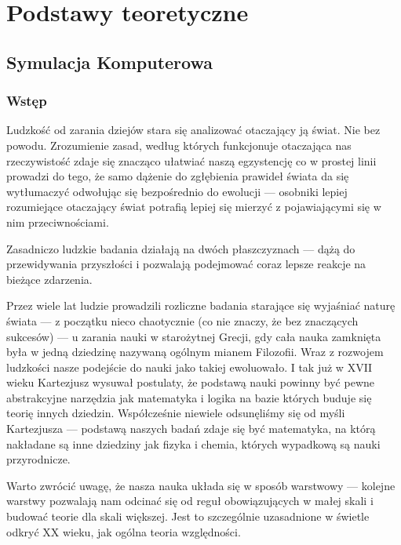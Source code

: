 \chapter{Podstawy teoretyczne}
\section[Symulacja komputerowa][Symulacja komputerowa]{Symulacja Komputerowa}

\subsection{Wstęp}
\par{
Ludzkość od zarania dziejów stara się analizować otaczający ją świat. Nie bez powodu. Zrozumienie zasad, według których funkcjonuje otaczająca nas rzeczywistość zdaje się znacząco ułatwiać naszą egzystencję co w prostej linii prowadzi do tego, że samo dążenie do zgłębienia prawideł świata da się wytłumaczyć odwołując się bezpośrednio do ewolucji --- osobniki lepiej rozumiejące otaczający świat potrafią lepiej się mierzyć z pojawiającymi się w nim przeciwnościami.
}

\par{
Zasadniczo ludzkie badania działają na dwóch płaszczyznach --- dążą do przewidywania przyszłości i pozwalają podejmować coraz lepsze reakcje na bieżące zdarzenia.
}

\par{
Przez wiele lat ludzie prowadzili rozliczne badania starające się wyjaśniać naturę świata --- z początku nieco chaotycznie (co nie znaczy, że bez znaczących sukcesów) --- u zarania nauki w starożytnej Grecji, gdy cała nauka zamknięta była w jedną dziedzinę nazywaną ogólnym mianem Filozofii.
Wraz z rozwojem ludzkości nasze podejście do nauki jako takiej ewoluowało. I tak już w XVII wieku Kartezjusz wysuwał postulaty, że podstawą nauki powinny być pewne abstrakcyjne narzędzia jak matematyka i logika na bazie których buduje się teorię innych dziedzin. Współcześnie niewiele odsunęliśmy się od myśli Kartezjusza --- podstawą naszych badań zdaje się być matematyka, na którą nakładane są inne dziedziny jak fizyka i chemia, których wypadkową są nauki przyrodnicze.
}

\par{
Warto zwrócić uwagę, że nasza nauka układa się w sposób warstwowy --- kolejne warstwy pozwalają nam odcinać się od reguł obowiązujących w małej skali i budować teorie dla skali większej. Jest to szczególnie uzasadnione w świetle odkryć XX wieku, jak ogólna teoria względności.
}

